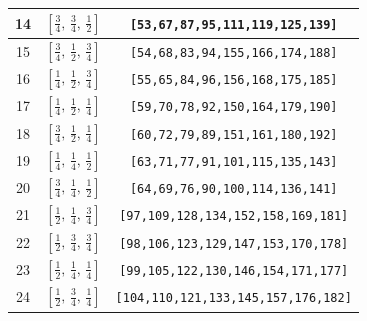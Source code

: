 \documentclass[fleqn,8pt]{jsarticle}
\begin{document}
\begin{longtable}{ccc}
14 & $\left[ \frac{3}{4},\, \frac{3}{4},\, \frac{1}{2} \right]$ & {\tt [53,67,87,95,111,119,125,139]} \\ \hline
15 & $\left[ \frac{3}{4},\, \frac{1}{2},\, \frac{3}{4} \right]$ & {\tt [54,68,83,94,155,166,174,188]} \\ \hline
16 & $\left[ \frac{1}{4},\, \frac{1}{2},\, \frac{3}{4} \right]$ & {\tt [55,65,84,96,156,168,175,185]} \\ \hline
17 & $\left[ \frac{1}{4},\, \frac{1}{2},\, \frac{1}{4} \right]$ & {\tt [59,70,78,92,150,164,179,190]} \\ \hline
18 & $\left[ \frac{3}{4},\, \frac{1}{2},\, \frac{1}{4} \right]$ & {\tt [60,72,79,89,151,161,180,192]} \\ \hline
19 & $\left[ \frac{1}{4},\, \frac{1}{4},\, \frac{1}{2} \right]$ & {\tt [63,71,77,91,101,115,135,143]} \\ \hline
20 & $\left[ \frac{3}{4},\, \frac{1}{4},\, \frac{1}{2} \right]$ & {\tt [64,69,76,90,100,114,136,141]} \\ \hline
21 & $\left[ \frac{1}{2},\, \frac{1}{4},\, \frac{3}{4} \right]$ & {\tt [97,109,128,134,152,158,169,181]} \\ \hline
22 & $\left[ \frac{1}{2},\, \frac{3}{4},\, \frac{3}{4} \right]$ & {\tt [98,106,123,129,147,153,170,178]} \\ \hline
23 & $\left[ \frac{1}{2},\, \frac{1}{4},\, \frac{1}{4} \right]$ & {\tt [99,105,122,130,146,154,171,177]} \\ \hline
24 & $\left[ \frac{1}{2},\, \frac{3}{4},\, \frac{1}{4} \right]$ & {\tt [104,110,121,133,145,157,176,182]} \\
\end{longtable}
\renewcommand{\arraystretch}{1.2}
\end{document}
